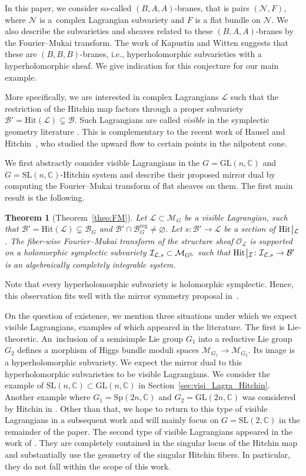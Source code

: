 \documentclass[10pt,a4paper]{amsart}
\numberwithin{equation}{section}
\newtheorem{theo}{Theorem}[section]
\theoremstyle{definition}
\newcommand{\reg}{\mathrm{reg}}
\newcommand{\rest}{\: \rule[-3.5pt]{0.5pt}{11.5pt}\,{}}
\renewcommand{\to}{\rightarrow}
\newcommand{\calB}{\mathcal{B}}
\newcommand{\calI}{\mathcal{I}}
\newcommand{\calL}{\mathcal{L}}
\newcommand{\calM}{\mathcal{M}}
\newcommand{\calN}{\mathcal{N}}
\newcommand{\calO}{\mathcal{O}}
\newcommand{\CC}{\mathbb{C}}
\newcommand{\Hit}{\mathrm{Hit}}
\newcommand{\GL}{\mathrm{GL}}
\newcommand{\SL}{\mathrm{SL}}
\newcommand{\Sp}{\mathrm{Sp}}
\begin{document}
In this paper, we consider so-called $(B,A,A)$-branes, that is pairs $(\calN,F)$, where $\calN$ is a~complex Lagrangian subvariety and $F$ is a flat bundle on $\calN$. We also describe the subvarieties and sheaves related to these $(B,A,A)$-branes by the Fourier--Mukai transform. The work of Kapustin and Witten \cite{KapustinWitten} suggests that these are $(B,B,B)$-branes, i.e., hyperholomorphic subvarieties with a hyperholomorphic sheaf. We give indication for this conjecture for our main example.

More specifically, we are interested in complex Lagrangians $\calL$ such that the restriction of the Hitchin map factors through a proper subvariety $\calB'=\Hit(\calL)\subsetneq \calB$. Such Lagrangians are called \textit{visible} in the symplectic geometry literature \cite{visible}. This is complementary to the recent work of Hausel and Hitchin~\cite{HauselHitchin}, who studied the upward flow to certain points in the nilpotent cone.

We first abstractly consider visible Lagrangians in the $G=\GL(n,\CC)$ and $G=\SL(n,\CC)$-Hitchin system and describe their proposed mirror dual by computing the Fourier--Mukai transform of flat sheaves on them. The first main result is the following.

\begin{theo}[{Theorem~\ref{theo:FM}}]\label{theo:1}
 Let $\calL \subset \calM_G$ be a visible Lagrangian, such that $\calB'=\Hit(\calL) \subsetneq \calB_G$ and $\calB' \cap \calB^\reg_G \neq \varnothing$. Let $s\colon \calB' \to \calL$ be a section of $\Hit\rest_{\calL}$. The fiber-wise Fourier--Mukai transform of the structure sheaf $\calO_\calL$ is supported on a holomorphic symplectic subvariety $\calI_{\calL,s} \subset \calM_{G^{\rm L}}$ such that $\Hit\rest_{\calI}\colon \calI_{\calL,s} \to \calB'$ is an algebraically completely integrable system.
\end{theo}

Note that every hyperholomorphic subvariety is holomorphic symplectic. Hence, this observation fits well with the mirror symmetry proposal in~\cite{KapustinWitten}.

On the question of existence, we mention three situations under which we expect visible Lagrangians, examples of which appeared in the literature. The first is Lie-theoretic. An~inclusion of a semisimple Lie group $G_1$ into a reductive Lie group $G_2$ defines a morphism of Higgs bundle moduli spaces $\calM_{G_1} \to \calM_{G_2}$. Its image is a hyperholomorphic subvariety. We expect the mirror dual to this hyperholomorphic subvarieties to be visible Lagrangians. We consider the example of $\SL(n,\CC) \subset \GL(n,\CC)$ in Section~\ref{sec:visi_Lagra_Hitchin}. Another example where $G_1=\Sp(2n,\CC)$ and $G_2=\GL(2n,\CC)$ was considered by Hitchin in \cite{HitchinSpUmm}. Other than that, we hope to return to this type of visible Lagrangians in a subsequent work and will mainly focus on $G=\SL(2,\CC)$ in the remainder of the paper.
The second type of visible Lagrangians appeared in the work of \cite{FGOP, FHHO, FrancoPeon}. They are completely contained in the singular locus of the Hitchin map and substantially use the geometry of the singular Hitchin fibers. In particular, they do not fall within the scope of this work.
\end{document}
